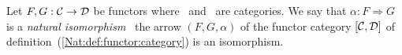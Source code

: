 \begin{defin}\label{Nat:def:isomorphsim}
    Let $F,G:\mbox{$\cal C$}\to\mbox{$\cal D$}$ be functors where \Cat\ and \Dat\ are categories.
    We say that $\alpha:F\Rightarrow G$ is a {\em natural isomorphism} 
    \ifand\ the arrow $(F,G,\alpha)$ of the functor category
    $[\mbox{$\cal C$},\mbox{$\cal D$}]$ of definition~(\ref{Nat:def:functor:category}) 
    is an isomorphism.
\end{defin}
